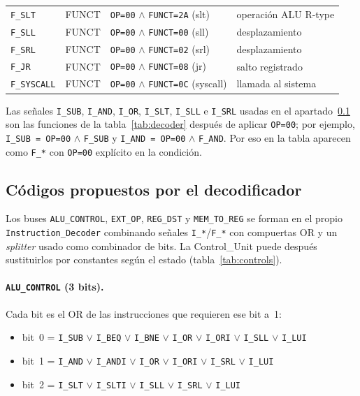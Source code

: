 \documentclass[11pt,a4paper]{article}
\begin{document}
\begin{longtable}{@{}p{2.4cm}p{2.2cm}p{4.5cm}p{6.0cm}@{}}
\texttt{F\_SLT} & FUNCT & \texttt{OP=00} $\land$ \texttt{FUNCT=2A} (slt) & operación ALU R-type \\
\texttt{F\_SLL} & FUNCT & \texttt{OP=00} $\land$ \texttt{FUNCT=00} (sll) & desplazamiento \\
\texttt{F\_SRL} & FUNCT & \texttt{OP=00} $\land$ \texttt{FUNCT=02} (srl) & desplazamiento \\
\texttt{F\_JR} & FUNCT & \texttt{OP=00} $\land$ \texttt{FUNCT=08} (jr) & salto registrado \\
\texttt{F\_SYSCALL} & FUNCT & \texttt{OP=00} $\land$ \texttt{FUNCT=0C} (syscall) & llamada al sistema \\
\bottomrule
\end{longtable}

Las señales \texttt{I\_SUB}, \texttt{I\_AND}, \texttt{I\_OR}, \texttt{I\_SLT}, \texttt{I\_SLL} e \texttt{I\_SRL} usadas en el apartado~\ref{sec:codigos} son las funciones de la tabla~\ref{tab:decoder} después de aplicar \texttt{OP=00}; por ejemplo, \texttt{I\_SUB = OP=00} $\land$ \texttt{F\_SUB} y \texttt{I\_AND = OP=00} $\land$ \texttt{F\_AND}. Por eso en la tabla aparecen como \texttt{F\_*} con \texttt{OP=00} explícito en la condición.

\subsection{Códigos propuestos por el decodificador}
\label{sec:codigos}

Los buses \texttt{ALU\_CONTROL}, \texttt{EXT\_OP}, \texttt{REG\_DST} y \texttt{MEM\_TO\_REG} se forman en el propio \texttt{Instruction\_Decoder} combinando señales \texttt{I\_*}/\texttt{F\_*} con compuertas OR y un \emph{splitter} usado como combinador de bits. La Control\_Unit puede después sustituirlos por constantes según el estado (tabla~\ref{tab:controls}).

\paragraph{\texttt{ALU\_CONTROL} (3 bits).} Cada bit es el OR de las instrucciones que requieren ese bit a~1:

\begin{itemize}
  \item bit~0 = \texttt{I\_SUB} $\lor$ \texttt{I\_BEQ} $\lor$ \texttt{I\_BNE} $\lor$ \texttt{I\_OR} $\lor$ \texttt{I\_ORI} $\lor$ \texttt{I\_SLL} $\lor$ \texttt{I\_LUI}
  \item bit~1 = \texttt{I\_AND} $\lor$ \texttt{I\_ANDI} $\lor$ \texttt{I\_OR} $\lor$ \texttt{I\_ORI} $\lor$ \texttt{I\_SRL} $\lor$ \texttt{I\_LUI}
  \item bit~2 = \texttt{I\_SLT} $\lor$ \texttt{I\_SLTI} $\lor$ \texttt{I\_SLL} $\lor$ \texttt{I\_SRL} $\lor$ \texttt{I\_LUI}
\end{itemize}
\end{document}
